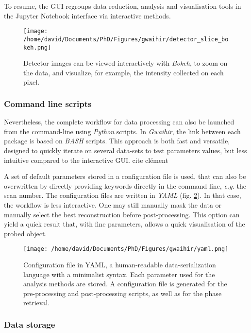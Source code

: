 To resume, the GUI regroups data reduction, analysis and visualisation tools in the Jupyter Notebook interface via interactive methods.

\begin{figure}[!htb]
    \centering
    \texttt{[image: /home/david/Documents/PhD/Figures/gwaihir/detector\_slice\_bokeh.png]}
    \caption{Detector images can be viewed interactively with \textit{Bokeh}, to zoom on the data, and visualize, for example, the intensity collected on each pixel.}
    \label{fig:BokehDetector}
\end{figure}

\subsubsection{Command line scripts}

Nevertheless, the complete workflow for data processing can also be launched from the command-line using \textit{Python} scripts.
In \textit{Gwaihir}, the link between each package is based on \textit{BASH} scripts. This approach is both fast and versatile, designed to quickly iterate on several data-sets to test parameters values, but less intuitive compared to the interactive GUI.
cite clément

A set of default parameters stored in a configuration file is used, that can also be overwritten by directly providing keywords directly in the command line, \textit{e.g.} the scan number.
The configuration files are written in \textit{YAML} (fig. \ref{fig:YAML_file}).
In that case, the workflow is less interactive. One may still manually mask the data or manually select the best reconstruction before post-processing. This option can yield a quick result that, with fine parameters, allows a quick visualisation of the probed object.

\begin{figure}[!htb]
    \centering
    \texttt{[image: /home/david/Documents/PhD/Figures/gwaihir/yaml.png]}
    \caption{Configuration file in YAML, a human-readable data-serialization language with a minimalist syntax. Each parameter used for the analysis methods are stored. A configuration file is generated for the pre-processing and post-processing scripts, as well as for the phase retrieval.}
    \label{fig:YAML_file}
\end{figure}

\subsubsection{Data storage}

